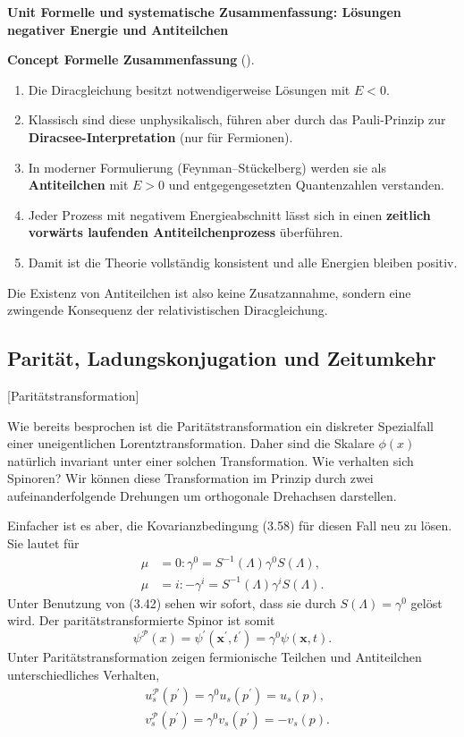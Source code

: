 \documentclass[10pt, letterpaper]{article}
\newcommand{\CustomHeading}[3]{%
  \par\medskip\noindent%
  \textbf{#1 #2} \textnormal{(#3)}.\enskip%
}
\newenvironment{CONC}[2]{\begin{unitbox}\CustomHeading{Concept}{#1}{#2}}{\end{unitbox}}
\newenvironment{unit}[1]
  {\begin{unitbox}\textbf{Unit #1}\par\smallskip}
  {\end{unitbox}}
\begin{document}
\begin{unit}{Formelle und systematische Zusammenfassung: Lösungen negativer Energie und Antiteilchen}
\begin{CONC}{Formelle Zusammenfassung}{}
\begin{enumerate}[label=\roman*)]
\item Die Diracgleichung besitzt notwendigerweise Lösungen mit $E<0$.
\item Klassisch sind diese unphysikalisch, führen aber durch das Pauli-Prinzip zur \textbf{Diracsee-Interpretation} (nur für Fermionen).
\item In moderner Formulierung (Feynman–Stückelberg) werden sie als \textbf{Antiteilchen} mit $E>0$ und entgegengesetzten Quantenzahlen verstanden.
\item Jeder Prozess mit negativem Energieabschnitt lässt sich in einen \textbf{zeitlich vorwärts laufenden Antiteilchenprozess} überführen.
\item Damit ist die Theorie vollständig konsistent und alle Energien bleiben positiv.
\end{enumerate}
Die Existenz von Antiteilchen ist also keine Zusatzannahme, sondern eine zwingende Konsequenz der relativistischen Diracgleichung.
\end{CONC}

\end{unit}


\pagebreak

\subsection{Parität, Ladungskonjugation und Zeitumkehr}

[Paritätstransformation]

Wie bereits besprochen ist die Paritätstransformation ein diskreter Spezialfall einer uneigentlichen Lorentztransformation. Daher sind die Skalare $\phi(x)$ natürlich invariant unter einer solchen Transformation. Wie verhalten sich Spinoren? Wir können diese Transformation im Prinzip durch zwei aufeinanderfolgende Drehungen um orthogonale Drehachsen darstellen. 

Einfacher ist es aber, die Kovarianzbedingung (3.58) für diesen Fall neu zu lösen. Sie lautet für
$$
\begin{aligned}
\mu & =0: \gamma^{0}=S^{-1}(\Lambda) \gamma^{0} S(\Lambda), \\
\mu & =i:-\gamma^{i}=S^{-1}(\Lambda) \gamma^{i} S(\Lambda) .
\end{aligned}
$$
Unter Benutzung von (3.42) sehen wir sofort, dass sie durch $S(\Lambda)=\gamma^{0}$ gelöst wird. Der paritätstransformierte Spinor ist somit
$$
\psi^{\mathcal{P}}(x)=\psi^{\prime}\left(\mathbf{x}^{\prime}, t^{\prime}\right)=\gamma^{0} \psi(\mathbf{x}, t) .
$$
Unter Paritätstransformation zeigen fermionische Teilchen und Antiteilchen unterschiedliches Verhalten,
$$
\begin{aligned}
& u_{s}^{\mathcal{P}}\left(p^{\prime}\right)=\gamma^{0} u_{s}\left(p^{\prime}\right)=u_{s}(p), \\
& v_{s}^{\mathcal{P}}\left(p^{\prime}\right)=\gamma^{0} v_{s}\left(p^{\prime}\right)=-v_{s}(p) .
\end{aligned}
$$
\end{document}
